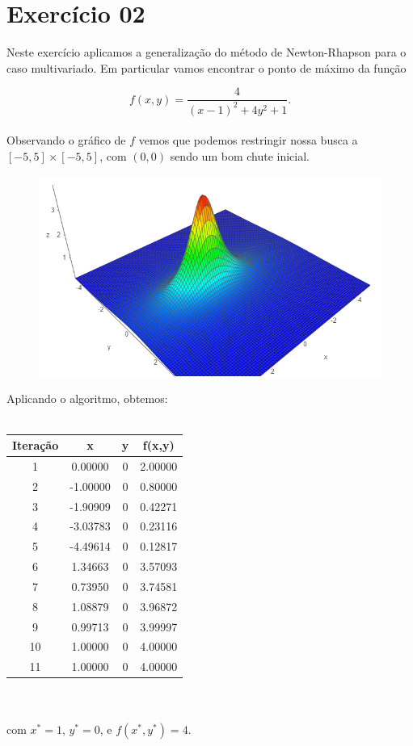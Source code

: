 \documentclass{article}
\begin{document}
\section*{Exercício 02}

Neste exercício aplicamos a generalização do método de Newton-Rhapson para o caso multivariado.
Em particular vamos encontrar o ponto de máximo da função

$$ f(x,y) = \frac{4}{(x-1)^2 + 4y^2 + 1}.$$ \\

Observando o gráfico de $f$ vemos que podemos restringir nossa busca a $[-5,5] \times [-5,5]$,
com $(0,0)$ sendo um bom chute inicial. 

\begin{figure}[!h]
  \includegraphics[scale=0.6]{ex2/ex2_1.png}
\end{figure}

\newpage

Aplicando o algoritmo, obtemos: \\ \\

\begin{tabular}{cccc}
	\hline Iteração & x & y & f(x,y) \\ \hline
	1  &  0.00000 & 0 & 2.00000 \\
	2  & -1.00000 & 0 & 0.80000 \\
	3  & -1.90909 & 0 & 0.42271 \\
	4  & -3.03783 & 0 & 0.23116 \\
	5  & -4.49614 & 0 & 0.12817 \\
	6  &  1.34663 & 0 & 3.57093 \\
	7  &  0.73950 & 0 & 3.74581 \\
	8  &  1.08879 & 0 & 3.96872 \\
	9  &  0.99713 & 0 & 3.99997 \\
	10 &  1.00000 & 0 & 4.00000 \\
	11 &  1.00000 & 0 & 4.00000  \\ \hline
\end{tabular} \\ \\ 

com $x^* = 1$, $y^*=0$, e $f(x^*,y^*)=4$.
\end{document}
